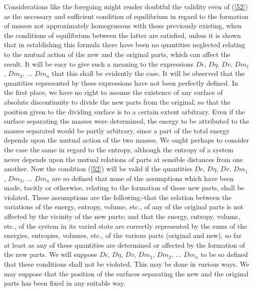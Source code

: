 \documentclass[12pt]{article}
\begin{document}
Considerations like the foregoing might render doubtful the validity even of (\ref{52}) as the necessary and sufficient condition of equilibrium in regard to the formation of masses not approximately homogeneous with those previously existing, when the conditions of equilibrium between the latter are satisfied, unless it is shown that in establishing this formula there have been no quantities neglected relating to the mutual action of the new and the original parts, which can affect the result.  It will be easy to give such a meaning to the expressions $D\epsilon$, $D\eta$, $Dv$, $Dm_1$, $Dm_2$, ... $D m_n$ that this shall be evidently the case. It will be observed that the quantities represented by these expressions have not been perfectly defined. In the first place, we have no right to assume the existence of any surface of absolute discontinuity to divide the new parts from the original, so that the position given to the dividing surface is to a certain extent arbitrary. 
Even if the surface separating the masses were determined, the energy to be attributed to the masses separated would be partly arbitrary, since a part of the total energy depends upon the mutual action of the two masses. We ought perhaps to consider the case the same in regard to the entropy, although the entropy of a system never depends upon the mutual relations of parts at sensible distances from one another. Now the condition (\ref{52}) will be valid if the quantities $D\epsilon$, $D\eta$, $Dv$, $Dm_1$, $Dm_2$, ... $D m_n$ are so defined that none of the assumptions which have been made, tacitly or otherwise, relating to the formation of these new parts, shall be violated. These assumptions are the following:-that the relation between the variations of the energy, entropy, volume, etc., of any of the original parts is not affected by the vicinity of the new parts; and that the energy, entropy, volume, etc., of the system in its varied state are correctly represented by the sums of the energies, entropies, volumes, etc., of the various parts (original and new), so far at least as any of these quantities are determined or affected by the formation of the new parts. We will suppose $D\epsilon$, $D\eta$, $Dv$, $Dm_1$, $Dm_2$, ... $D m_n$ to be so defined that these conditions shall not be violated.  This may be done in various ways. We may suppose that the position of the surfaces separating the new and the original parts has been fixed in any suitable way. 
\end{document}
